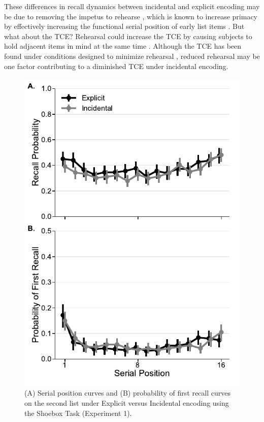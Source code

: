 \documentclass[man,natbib,floatsintext]{apa6} %
\begin{document}
These differences in recall dynamics between incidental and explicit encoding may be due to removing the impetus to rehearse \citep{MarsWerd72,Neat93,GlenEtal80}, which is known to increase primacy by effectively increasing the  functional serial position of early list items \citep{Rund71,BrodMurd77,TanWard00}. But what about the TCE? Rehearsal could increase the TCE by causing subjects to hold adjacent items in mind at the same time \citep{Hint16}. Although the TCE has been found under conditions designed to minimize rehearsal \citep{HowaKaha99}, reduced rehearsal may be one factor contributing to a diminished TCE under incidental encoding.

\begin{figure}
\includegraphics{figures/E1_spc_list2.pdf}
\caption{(A) Serial position curves and (B) probability of first recall curves on the second list under Explicit versus Incidental encoding using the Shoebox Task (Experiment 1).\spcpaneltext}
\label{e1_l2_spc}
\end{figure}
\end{document}
